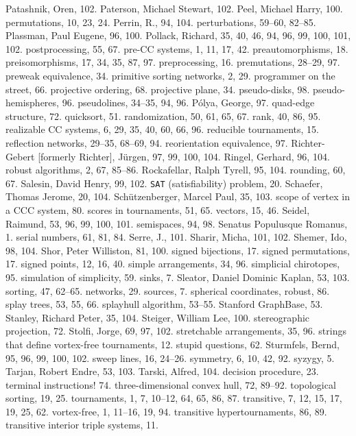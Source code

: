 Patashnik, Oren, 102.
Paterson, Michael Stewart, 102.
Peel, Michael Harry, 100.
permutations, 10, 23, 24.
Perrin, R., 94, 104.
perturbations, 59--60, 82--85.
Plassman, Paul Eugene, 96, 100.
Pollack, Richard, 35, 40, 46, 94, 96, 99, 100, 101, 102.
postprocessing, 55, 67.
pre-CC systems, 1, 11, 17, 42.
preautomorphisms, 18.
preisomorphisms, 17, 34, 35, 87, 97.
preprocessing, 16.
premutations, 28--29, 97.
preweak equivalence, 34.
primitive sorting networks, 2, 29.
programmer on the street, 66.
projective ordering, 68.
projective plane, 34.
pseudo-disks, 98.
pseudo-hemispheres, 96.
pseudolines, 34--35, 94, 96.
P\'olya, George, 97.
\medskip
quad-edge structure, 72.
quicksort, 51.
\medskip
randomization, 50, 61, 65, 67.
rank, 40, 86, 95.
realizable CC systems, 6, 29, 35, 40, 60, 66, 96.
reducible tournaments, 15.
reflection networks, 29--35, 68--69, 94.
reorientation equivalence, 97.
Richter-Gebert [formerly Richter], J\"urgen, 97, 99, 100, 104.
Ringel, Gerhard, 96, 104.
robust algorithms, 2, 67, 85--86.
Rockafellar, Ralph Tyrell, 95, 104.
rounding, 60, 67.
\medskip
Salesin, David Henry, 99, 102.
{\tt SAT} (satisfiability) problem, 20.
Schaefer, Thomas Jerome, 20, 104.
Sch\"utzenberger, Marcel Paul, 35, 103.
scope of vertex in a CCC system, 80.
scores in tournaments, 51, 65.
\sub vectors, 15, 46.
Seidel, Raimund, 53, 96, 99, 100, 101.
semispaces, 94, 98.
Senatus Populusque Romanus, 1.
serial numbers, 61, 81, 84.
Serre, J., 101.
Sharir, Micha, 101, 102.
Shemer, Ido, 98, 104.
Shor, Peter Williston, 81, 100.
signed bijections, 17.
signed permutations, 17.
signed points, 12, 16, 40.
simple arrangements, 34, 96.
simplicial chirotopes, 95.
simulation of simplicity, 59.
sinks, 7.
Sleator, Daniel Dominic Kaplan, 53, 103.
sorting, 47, 62--65.
\sub networks, 29.
sources, 7.
spherical coordinates, robust, 86.
splay trees, 53, 55, 66.
splayhull algorithm, 53--55.
Stanford GraphBase, 53.
Stanley, Richard Peter, 35, 104.
Steiger, William Lee, 100.
stereographic projection, 72.
Stolfi, Jorge, 69, 97, 102.
stretchable arrangements, 35, 96.
strings that define vortex-free tournaments, 12.
stupid questions, 62.
Sturmfels, Bernd, 95, 96, 99, 100, 102.
sweep lines, 16, 24--26.
symmetry, 6, 10, 42, 92.
syzygy, 5.
\medskip
Tarjan, Robert Endre, 53, 103.
Tarski, Alfred, 104.
\sub decision procedure, 23.
terminal instructions! 74.
three-dimensional convex hull, 72, 89--92.
topological sorting, 19, 25.
tournaments, 1, 7, 10--12, 64, 65, 86, 87.
\sub transitive, 7, 12, 15, 17, 19, 25, 62.
\sub vortex-free, 1, 11--16, 19, 94.
transitive hypertournaments, 86, 89.
transitive interior triple systems, 11.
